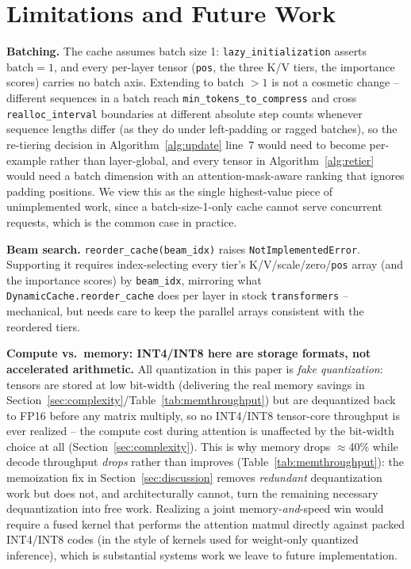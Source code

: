 \documentclass[conference]{IEEEtran}
\begin{document}
\section{Limitations and Future Work}
\label{sec:limitations}

\textbf{Batching.} The cache assumes batch size 1: \texttt{lazy\_initialization} asserts
$\mathrm{batch}=1$, and every per-layer tensor (\texttt{pos}, the three K/V tiers, the
importance scores) carries no batch axis. Extending to batch $>1$ is not a cosmetic
change -- different sequences in a batch reach \texttt{min\_tokens\_to\_compress} and
cross \texttt{realloc\_interval} boundaries at different absolute step counts whenever
sequence lengths differ (as they do under left-padding or ragged batches), so the
re-tiering decision in Algorithm~\ref{alg:update} line~7 would need to become per-example
rather than layer-global, and every tensor in Algorithm~\ref{alg:retier} would need a
batch dimension with an attention-mask-aware ranking that ignores padding positions. We
view this as the single highest-value piece of unimplemented work, since a
batch-size-1-only cache cannot serve concurrent requests, which is the common case in
practice.

\textbf{Beam search.} \texttt{reorder\_cache(beam\_idx)} raises
\texttt{NotImplementedError}. Supporting it requires index-selecting every tier's
K/V/scale/zero/\texttt{pos} array (and the importance scores) by \texttt{beam\_idx},
mirroring what \texttt{DynamicCache.reorder\_cache} does per layer in stock
\texttt{transformers} -- mechanical, but needs care to keep the parallel arrays
consistent with the reordered tiers.

\textbf{Compute vs.\ memory: INT4/INT8 here are storage formats, not accelerated
arithmetic.} All quantization in this paper is \emph{fake quantization}: tensors are
stored at low bit-width (delivering the real memory savings in
Section~\ref{sec:complexity}/Table~\ref{tab:memthroughput}) but are dequantized back to
FP16 before any matrix multiply, so no INT4/INT8 tensor-core throughput is ever
realized -- the compute cost during attention is unaffected by the bit-width choice at
all (Section~\ref{sec:complexity}). This is why memory drops $\approx$40\% while decode
throughput \emph{drops} rather than improves (Table~\ref{tab:memthroughput}): the
memoization fix in Section~\ref{sec:discussion} removes \emph{redundant} dequantization
work but does not, and architecturally cannot, turn the remaining necessary
dequantization into free work. Realizing a joint memory-\emph{and}-speed win would
require a fused kernel that performs the attention matmul directly against packed
INT4/INT8 codes (in the style of kernels used for weight-only quantized inference),
which is substantial systems work we leave to future implementation.
\end{document}
